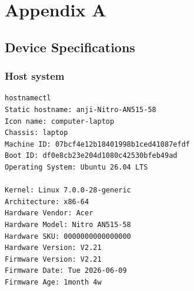 \chapter[Appendix A]{Appendix A}
\label{sec:appendix}

\section{Device Specifications}

\subsection{Host system}

\begin{verbatim}
hostnamectl
Static hostname: anji-Nitro-AN515-58
Icon name: computer-laptop
Chassis: laptop
Machine ID: 07bcf4e12b18401998b1ced41087efdf
Boot ID: df0e8cb23e204d1080c42530bfeb49ad
Operating System: Ubuntu 26.04 LTS

Kernel: Linux 7.0.0-28-generic
Architecture: x86-64
Hardware Vendor: Acer
Hardware Model: Nitro AN515-58
Hardware SKU: 0000000000000000
Hardware Version: V2.21
Firmware Version: V2.21
Firmware Date: Tue 2026-06-09
Firmware Age: 1month 4w
\end{verbatim}


